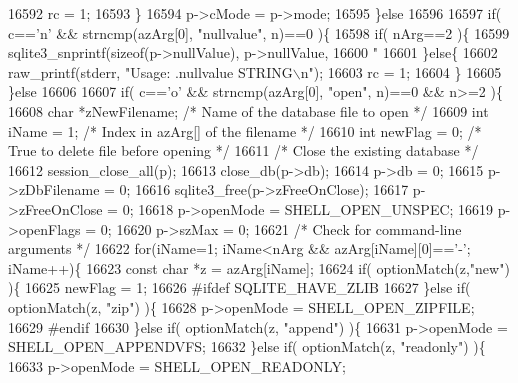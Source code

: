 \begin{DoxyCode}
{{{{{{{{{{{{{{{{{{{{{{{{{{{{{{{{{{{{{{{{{{{{{{{{{{{{{{{{16592       rc = 1;
16593     \}
16594     p->cMode = p->mode;
16595   \}\textcolor{keywordflow}{else}
16596 
16597   \textcolor{keywordflow}{if}( c==\textcolor{charliteral}{'n'} && strncmp(azArg[0], \textcolor{stringliteral}{"nullvalue"}, n)==0 )\{
16598     \textcolor{keywordflow}{if}( nArg==2 )\{
16599       sqlite3_snprintf(\textcolor{keyword}{sizeof}(p->nullValue), p->nullValue,
16600                        \textcolor{stringliteral}{"%
16601     \}\textcolor{keywordflow}{else}\{
16602       raw_printf(stderr, \textcolor{stringliteral}{"Usage: .nullvalue STRING\(\backslash\)n"});
16603       rc = 1;
16604     \}
16605   \}\textcolor{keywordflow}{else}
16606 
16607   \textcolor{keywordflow}{if}( c==\textcolor{charliteral}{'o'} && strncmp(azArg[0], \textcolor{stringliteral}{"open"}, n)==0 && n>=2 )\{
16608     \textcolor{keywordtype}{char} *zNewFilename;  \textcolor{comment}{/* Name of the database file to open */}
16609     \textcolor{keywordtype}{int} iName = 1;       \textcolor{comment}{/* Index in azArg[] of the filename */}
16610     \textcolor{keywordtype}{int} newFlag = 0;     \textcolor{comment}{/* True to delete file before opening */}
16611     \textcolor{comment}{/* Close the existing database */}
16612     session_close_all(p);
16613     close_db(p->db);
16614     p->db = 0;
16615     p->zDbFilename = 0;
16616     sqlite3_free(p->zFreeOnClose);
16617     p->zFreeOnClose = 0;
16618     p->openMode = SHELL_OPEN_UNSPEC;
16619     p->openFlags = 0;
16620     p->szMax = 0;
16621     \textcolor{comment}{/* Check for command-line arguments */}
16622     \textcolor{keywordflow}{for}(iName=1; iName<nArg && azArg[iName][0]==\textcolor{charliteral}{'-'}; iName++)\{
16623       \textcolor{keyword}{const} \textcolor{keywordtype}{char} *z = azArg[iName];
16624       \textcolor{keywordflow}{if}( optionMatch(z,\textcolor{stringliteral}{"new"}) )\{
16625         newFlag = 1;
16626 \textcolor{preprocessor}{#ifdef SQLITE\_HAVE\_ZLIB}
16627       \}\textcolor{keywordflow}{else} \textcolor{keywordflow}{if}( optionMatch(z, \textcolor{stringliteral}{"zip"}) )\{
16628         p->openMode = SHELL_OPEN_ZIPFILE;
16629 \textcolor{preprocessor}{#endif}
16630       \}\textcolor{keywordflow}{else} \textcolor{keywordflow}{if}( optionMatch(z, \textcolor{stringliteral}{"append"}) )\{
16631         p->openMode = SHELL_OPEN_APPENDVFS;
16632       \}\textcolor{keywordflow}{else} \textcolor{keywordflow}{if}( optionMatch(z, \textcolor{stringliteral}{"readonly"}) )\{
16633         p->openMode = SHELL_OPEN_READONLY;
}}}}}}}}}}}}}}}}}}}}}}}}}}}}}}}}}}}}}}}}}}}}}}}}}}}}}}}}}
\end{DoxyCode}
